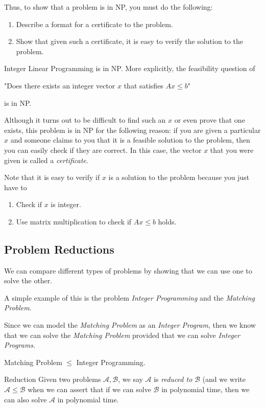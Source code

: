 Thus, to show that a problem is in NP, you must do the following:
\begin{enumerate}
\item Describe a format for a certificate to the problem.
\item Show that given such a certificate, it is easy to verify the solution to the problem.
\end{enumerate}
\begin{example}{}{}
Integer Linear Programming is in NP.  More explicitly, the feasibility question of
\begin{center}
"Does there exists an integer vector $x$ that satisfies $Ax\leq b$"
\end{center}
is in NP.  

Although it turns out to be difficult to find such an $x$ or even prove that one exists, this problem is in NP for the following reason:  if you are given a particular $x$ and someone claims to you that it is a feasible solution to the problem, then you can easily check if they are correct.  
In this case, the vector $x$ that you were given is called a \emph{certificate}.

Note that it is easy to verify if $x$ is a solution to the problem because you just have to 
\begin{enumerate}
\item Check if $x$ is integer.
\item Use matrix multiplication to check if $Ax \leq b$ holds.
\end{enumerate}
\end{example}
\subsection{Problem Reductions}

We can compare different types of problems by showing that we can use one to solve the other.

A simple example of this is the problem \emph{Integer Programming} and the \emph{Matching Problem}.

Since we can model the \emph{Matching Problem} as an \emph{Integer Program}, then we know that we can solve the \emph{Matching Problem} provided that we can solve \emph{Integer Programs.}
\begin{center}
Matching Problem $\leq$ Integer Programming.
\end{center}

\begin{definition}{Reduction}{}
Given two problems $\mathcal A, \mathcal B$, we say $\mathcal A$ is \emph{reduced to} $\mathcal B$ (and we write $\mathcal A \leq \mathcal B$ when we can assert that if we can solve $\mathcal B$ in polynomial time, then we can also solve $\mathcal A$ in polynomial time.
\end{definition}

